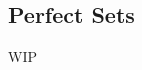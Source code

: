 \documentclass[../poma-notes.tex]{subfiles}
\begin{document}
\subsection*{Perfect Sets}

WIP
\end{document}
